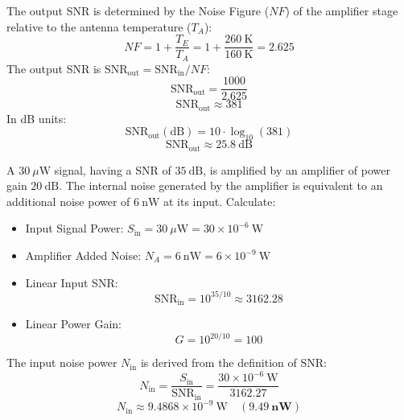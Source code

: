 
\begin{solutionblock}
The output SNR is determined by the Noise Figure ($NF$) of the amplifier stage relative to the antenna temperature ($T_A$):
\[
NF = 1 + \frac{T_E}{T_A} = 1 + \frac{260 \ \text{K}}{160 \ \text{K}} = 2.625
\]
The output SNR is $\text{SNR}_{\text{out}} = \text{SNR}_{\text{in}} / NF$:
\[
\text{SNR}_{\text{out}} = \frac{1000}{2.625}
\]
\[
\text{SNR}_{\text{out}} \approx 381
\]
In dB units:
\[
\text{SNR}_{\text{out}} (\text{dB}) = 10 \cdot \log_{10}(381)
\]
\[
\text{SNR}_{\text{out}} \approx 25.8 \ \text{dB}
\]
\end{solutionblock}





A $30 \ \mu\text{W}$ signal, having a $\text{SNR}$ of $35 \ \text{dB}$, is amplified by an amplifier
of power gain $20 \ \text{dB}$. The internal noise generated by the amplifier
is equivalent to an additional noise power of $6 \ \text{nW}$ at its input.
Calculate:


\begin{solutionblock}
\begin{itemize}
    \item Input Signal Power: $S_{\text{in}} = 30 \ \mu\text{W} = 30 \times 10^{-6} \ \text{W}$
    \item Amplifier Added Noise: $N_A = 6 \ \text{nW} = 6 \times 10^{-9} \ \text{W}$
    \item Linear Input SNR:
    \[
    \text{SNR}_{\text{in}} = 10^{35/10} \approx 3162.28
    \]
    \item Linear Power Gain:
    \[
    G = 10^{20/10} = 100
    \]
\end{itemize}
\end{solutionblock}

\begin{solutionblock}
The input noise power $N_{\text{in}}$ is derived from the definition of $\text{SNR}$:
\[
N_{\text{in}} = \frac{S_{\text{in}}}{\text{SNR}_{\text{in}}} = \frac{30 \times 10^{-6} \ \text{W}}{3162.27}
\]
\[
N_{\text{in}} \approx 9.4868 \times 10^{-9} \ \text{W} \quad (\mathbf{9.49 \ \text{nW}})
\]
\end{solutionblock}


